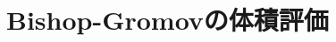 \documentclass[dvipdfmx,a4paper]{jsreport}
\theoremstyle{definition}
\begin{document}
\section{Bishop-Gromovの体積評価}










\end{document}
